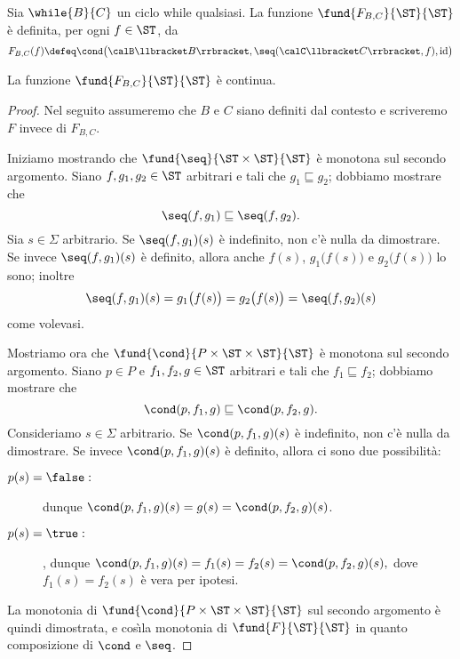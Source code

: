 \begin{definizione}
Sia $\while{B}{C}$ un ciclo while qualsiasi.
La funzione $\fund{F_{B,C}}{\ST}{\ST}$ \`e definita,
per ogni $f \in \ST$, da
\[
  F_{B,C}(f)
    \defeq
      \cond\bigl(\calB \llbracket B \rrbracket,
                         \seq(\calC \llbracket C \rrbracket, f),
                         \mathrm{id}\bigr)
\]
\end{definizione}

\begin{teorema}
La funzione $\fund{F_{B,C}}{\ST}{\ST}$ è continua.
\end{teorema}

\begin{proof}
Nel seguito assumeremo che $B$ e $C$ siano definiti dal contesto e scriveremo
$F$ invece di $F_{B,C}$.

Iniziamo mostrando che $\fund{\seq}{\ST \times \ST}{\ST}$
è monotona sul secondo argomento.
Siano $f, g_1, g_2 \in \ST$ arbitrari e tali che
$g_1 \sqsubseteq g_2$;  dobbiamo mostrare che
\[
  \seq(f, g_1) \sqsubseteq \seq(f, g_2).
\]
Sia $s \in \Sigma$ arbitrario.
Se $\seq(f, g_1)(s)$ \`e indefinito, non c'\`e nulla da dimostrare.
Se invece $\seq(f, g_1)(s)$ \`e definito,
allora anche $f(s)$, $g_1\bigl(f(s)\bigr)$ e $g_2\bigl(f(s)\bigr)$
lo sono;  inoltre
\[
    \seq(f, g_1)(s) = g_1\bigl(f(s)\bigr)
                    = g_2\bigl(f(s)\bigr)
  = \seq(f, g_2)(s)
\]
come volevasi.

Mostriamo ora che $\fund{\cond}{P \times \ST \times \ST}{\ST}$
è monotona sul secondo argomento.
Siano $p \in P$ e $f_1, f_2, g \in \ST$ arbitrari e tali che
$f_1 \sqsubseteq f_2$;  dobbiamo mostrare che
\[
  \cond(p, f_1, g) \sqsubseteq \cond(p, f_2, g).
\]
Consideriamo $s \in \Sigma$ arbitrario.
Se $\cond(p, f_1, g)(s)$ \`e indefinito, non c'\`e nulla da dimostrare.
Se invece $\cond(p, f_1, g)(s)$ \`e definito,
allora ci sono due possibilità:
\begin{description}
\item[$p(s) = \false:$] dunque
\(
  \cond(p, f_1, g)(s) = g(s) = \cond(p, f_2, g)(s)
\).
\item[$p(s) = \true:$], dunque
\(
  \cond(p, f_1, g)(s) = f_1(s) = f_2(s) = \cond(p, f_2, g)(s),
\)
dove $f_1(s) = f_2(s)$ è vera per ipotesi.
\end{description}
La monotonia di $\fund{\cond}{P \times \ST \times \ST}{\ST}$
sul secondo argomento è quindi dimostrata, e cos\`\i la monotonia
di $\fund{F}{\ST}{\ST}$ in quanto composizione di $\cond$ e $\seq$.


\end{proof}
